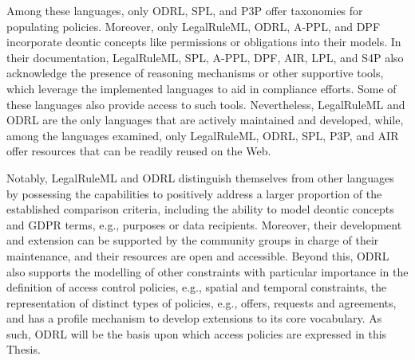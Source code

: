 Among these languages, only ODRL, SPL, and P3P offer taxonomies for populating policies.
Moreover, only LegalRuleML, ODRL, A-PPL, and DPF incorporate deontic concepts like permissions or obligations into their models.
In their documentation, LegalRuleML, SPL, A-PPL, DPF, AIR, LPL, and S4P also acknowledge the presence of reasoning mechanisms or other supportive tools, which leverage the implemented languages to aid in compliance efforts.
Some of these languages also provide access to such tools.
Nevertheless, LegalRuleML and ODRL are the only languages that are actively maintained and developed, while, among the languages examined, only LegalRuleML, ODRL, SPL, P3P, and AIR offer resources that can be readily reused on the Web.

Notably, LegalRuleML and ODRL distinguish themselves from other languages by possessing the capabilities to positively address a larger proportion of the established comparison criteria, including the ability to model deontic concepts and GDPR terms, e.g., purposes or data recipients.
Moreover, their development and extension can be supported by the community groups in charge of their maintenance, and their resources are open and accessible.
Beyond this, ODRL also supports the modelling of other constraints with particular importance in the definition of access control policies, e.g., spatial and temporal constraints, the representation of distinct types of policies, e.g., offers, requests and agreements, and has a profile mechanism to develop extensions to its core vocabulary.
As such, ODRL will be the basis upon which access policies are expressed in this Thesis.